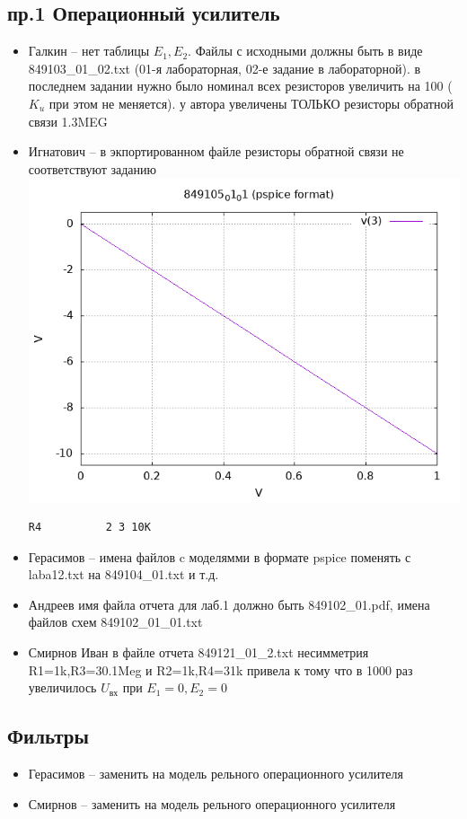 \documentclass[a4paper,landscape,11pt]{article}
\begin{document}
\subsection*{пр.1 Операционный усилитель}
\begin{itemize}
	\item Галкин -- нет таблицы $E_1,E_2$. Файлы с исходными должны быть в виде 849103\_01\_02.txt (01-я лабораторная, 02-е задание в лабораторной).
в последнем задании нужно было номинал всех  резисторов увеличить на 100 ($K_u$ при этом не меняется). у автора увеличены ТОЛЬКО резисторы обратной связи  1.3MEG

\item Игнатович -- в экпортированном файле резисторы обратной связи не соответствуют заданию
\includegraphics[scale=0.2]{"849105_01_01"}
\begin{verbatim}
R4          2 3 10K
\end{verbatim}
\item Герасимов -- %
имена файлов c моделямми в формате pspice поменять с laba12.txt на 849104\_01.txt и т.д.

\item Андреев имя файла отчета для лаб.1 должно быть 849102\_01.pdf, имена файлов схем 849102\_01\_01.txt
\item   Смирнов Иван в файле отчета  849121\_01\_2.txt несимметрия R1=1k,R3=30.1Meg и R2=1k,R4=31k привела к тому что в 1000 раз увеличилось $U_\text{вх}$  при $E_1=0, E_2=0$
\end{itemize}

\subsection*{Фильтры}
\begin{itemize}
\item Герасимов --  заменить на модель рельного операционного усилителя
\item Смирнов --  заменить на модель рельного операционного усилителя
\end{itemize}
\end{document}
